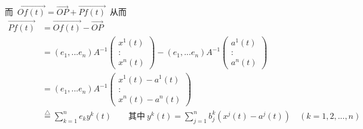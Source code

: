 而\ $\overrightarrow{Of(t)}=\overrightarrow{OP}+\overrightarrow{Pf(t)}$\ 从而
\begin{align*}
\overrightarrow{Pf(t)}&=\overrightarrow{Of(t)}-\overrightarrow{OP}
                      \\
                      &= (e_1,...e_n)A^{-1} 
                                           \left( 
                                            \begin{array}{c}
                                           x^1(t)
                                           \\
                                           \colon
                                           \\
                                           x^n(t)   
                                           \end{array}  
                                           \right)       
                                                                  -
                                                                       (e_1,...e_n)A^{-1}
                                                                                         \left( 
                                                                                         \begin{array}{c}
                                                                                         a^1(t)
                                                                                         \\
                                                                                         \colon
                                                                                         \\
                                                                                         a^n(t)   
                                                                                         \end{array}  
                                                                                         \right)              
                      \\
                      &=(e_1,...e_n)A^{-1}
                                           \left(  
                                           \begin{array}{c}
                                           x^1(t)- a^1(t)
                                           \\
                                           \colon
                                           \\
                                           x^n(t)-a^n(t)   
                                           \end{array}  
                                           \right)  
                      \\
                      &\overset{\bigtriangleup}{=}\sum_{k=1}^{n}e_ky^k(t) \qquad\text{其中}\ y^k(t)=\sum_{j=1}^{n}b_j^k( x^j(t)-a^j(t) )  \quad (k=1,2,...,n)  
\end{align*}
